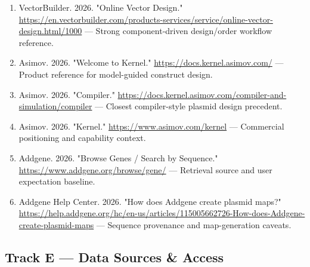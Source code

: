 \documentclass[11pt]{report}
\begin{document}
\begin{enumerate}
\item VectorBuilder. 2026. "Online Vector Design." \url{https://en.vectorbuilder.com/products-services/service/online-vector-design.html/1000} — Strong component-driven design/order workflow reference.
\item Asimov. 2026. "Welcome to Kernel." \url{https://docs.kernel.asimov.com/} — Product reference for model-guided construct design.
\item Asimov. 2026. "Compiler." \url{https://docs.kernel.asimov.com/compiler-and-simulation/compiler} — Closest compiler-style plasmid design precedent.
\item Asimov. 2026. "Kernel." \url{https://www.asimov.com/kernel} — Commercial positioning and capability context.
\item Addgene. 2026. "Browse Genes / Search by Sequence." \url{https://www.addgene.org/browse/gene/} — Retrieval source and user expectation baseline.
\item Addgene Help Center. 2026. "How does Addgene create plasmid maps?" \url{https://help.addgene.org/hc/en-us/articles/115005662726-How-does-Addgene-create-plasmid-maps} — Sequence provenance and map-generation caveats.
\end{enumerate}

\subsection{Track E — Data Sources \& Access}
\end{document}
